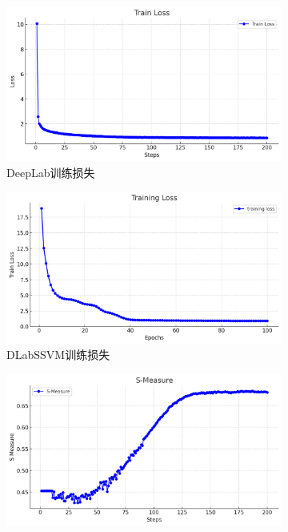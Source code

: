 \documentclass[a4paper,12pt]{ctexart}
\begin{document}
\begin{figure}[h!]
    \centering
    \begin{subfigure}{0.4\textwidth}
        \centering
        \includegraphics[width=\linewidth]{figures/deeplab_train_loss.png}
        \caption{DeepLab训练损失}
        \label{fig:dlabloss}
    \end{subfigure}%
    \hspace{0.1\textwidth}
    \begin{subfigure}{0.4\textwidth}
        \centering
        \includegraphics[width=\linewidth]{figures/ssvm_train_loss.png}
        \caption{DLabSSVM训练损失}
        \label{fig:dssvmloss}
    \end{subfigure}%
    \hspace{0.1\textwidth}
    \begin{subfigure}{0.4\textwidth}
        \centering
        \includegraphics[width=\linewidth]{figures/deeplab_smeasure.png}

\end{subfigure}
\end{figure}
\end{document}
